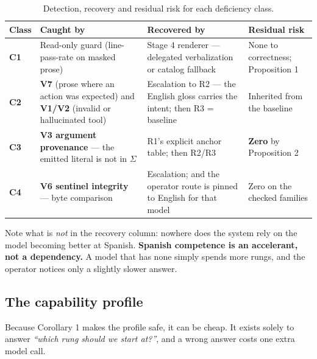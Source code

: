 \begin{table}[htbp]
\centering
\footnotesize
\caption{Detection, recovery and residual risk for each deficiency class.}
\label{tab:deficiency-neutralization}
\begin{tabular}{@{}p{}p{}p{}p{}@{}}
\toprule
\textbf{Class} & \textbf{Caught by} & \textbf{Recovered by} & \textbf{Residual risk} \\
\midrule
\textbf{C1} &
Read-only guard (line-pass-rate on masked prose) &
Stage 4 renderer --- delegated verbalization or catalog fallback &
None to correctness; Proposition 1 \\
\addlinespace
\textbf{C2} &
\textbf{V7} (prose where an action was expected) and \textbf{V1/V2} (invalid or
hallucinated tool) &
Escalation to R2 --- the English gloss carries the intent; then R3 = baseline &
Inherited from the baseline \\
\addlinespace
\textbf{C3} &
\textbf{V3 argument provenance} --- the emitted literal is not in $\Sigma$ &
R1's explicit anchor table; then R2/R3 &
\textbf{Zero} by Proposition 2 \\
\addlinespace
\textbf{C4} &
\textbf{V6 sentinel integrity} --- byte comparison &
Escalation; and the operator route is pinned to English for that model &
Zero on the checked families \\
\bottomrule
\end{tabular}
\end{table}

Note what is \emph{not} in the recovery column: nowhere does the system rely on the
model becoming better at Spanish. \textbf{Spanish competence is an accelerant, not a
dependency.} A model that has none simply spends more rungs, and the operator notices
only a slightly slower answer.

\subsection{The capability profile}
\label{sec:the-capability-profile}

Because Corollary 1 makes the profile safe, it can be cheap. It exists solely to
answer \emph{``which rung should we start at?''}, and a wrong answer costs one extra
model call.

